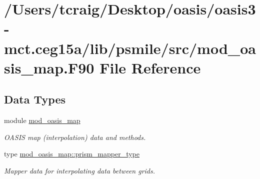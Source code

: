 \hypertarget{mod__oasis__map_8_f90}{\section{/\+Users/tcraig/\+Desktop/oasis/oasis3-\/mct.ceg15a/lib/psmile/src/mod\+\_\+oasis\+\_\+map.F90 File Reference}
\label{mod__oasis__map_8_f90}
}
\subsection*{Data Types}
\begin{DoxyCompactItemize}
\item 
module \hyperlink{classmod__oasis__map}{mod\+\_\+oasis\+\_\+map}
\begin{DoxyCompactList}\small\item\em O\+A\+S\+I\+S map (interpolation) data and methods. \end{DoxyCompactList}\item 
type \hyperlink{structmod__oasis__map_1_1prism__mapper__type}{mod\+\_\+oasis\+\_\+map\+::prism\+\_\+mapper\+\_\+type}
\begin{DoxyCompactList}\small\item\em Mapper data for interpolating data between grids. \end{DoxyCompactList}\end{DoxyCompactItemize}

